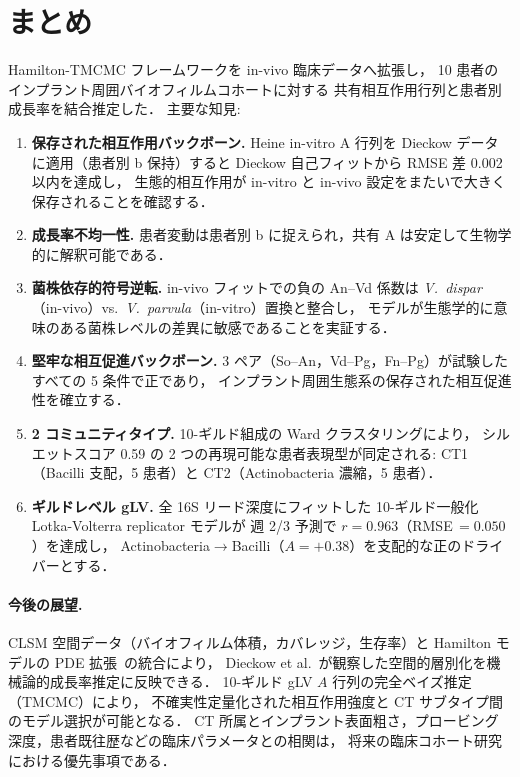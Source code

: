 \documentclass[11pt,a4paper]{article}
\begin{document}
\section{まとめ}
\label{sec:conclusions}

Hamilton-TMCMC フレームワークを in-vivo 臨床データへ拡張し，
10 患者のインプラント周囲バイオフィルムコホートに対する
共有相互作用行列と患者別成長率を結合推定した．
主要な知見:
\begin{enumerate}[nosep,leftmargin=*]
\item \textbf{保存された相互作用バックボーン.}
  Heine in-vitro A 行列を Dieckow データに適用（患者別 b 保持）すると
  Dieckow 自己フィットから RMSE 差 0.002 以内を達成し，
  生態的相互作用が in-vitro と in-vivo 設定をまたいで大きく保存されることを確認する．
\item \textbf{成長率不均一性.}
  患者変動は患者別 b に捉えられ，共有 A は安定して生物学的に解釈可能である．
\item \textbf{菌株依存的符号逆転.}
  in-vivo フィットでの負の An--Vd 係数は
  \textit{V.~dispar}（in-vivo）vs.\ \textit{V.~parvula}（in-vitro）置換と整合し，
  モデルが生態学的に意味のある菌株レベルの差異に敏感であることを実証する．
\item \textbf{堅牢な相互促進バックボーン.}
  3 ペア（So--An，Vd--Pg，Fn--Pg）が試験したすべての 5 条件で正であり，
  インプラント周囲生態系の保存された相互促進性を確立する．
\item \textbf{2 コミュニティタイプ.}
  10-ギルド組成の Ward クラスタリングにより，
  シルエットスコア 0.59 の 2 つの再現可能な患者表現型が同定される:
  CT1（Bacilli 支配，5 患者）と CT2（Actinobacteria 濃縮，5 患者）．
\item \textbf{ギルドレベル gLV.}
  全 16S リード深度にフィットした 10-ギルド一般化 Lotka-Volterra replicator モデルが
  週 2/3 予測で $r=0.963$（RMSE\,$=0.050$）を達成し，
  Actinobacteria$\to$Bacilli（$A=+0.38$）を支配的な正のドライバーとする．
\end{enumerate}

\paragraph{今後の展望.}
CLSM 空間データ（バイオフィルム体積，カバレッジ，生存率）と
Hamilton モデルの PDE 拡張~\cite{Klempt2025ContinuumBiofilm}の統合により，
Dieckow et al.\ が観察した空間的層別化を機械論的成長率推定に反映できる．
10-ギルド gLV $A$ 行列の完全ベイズ推定（TMCMC）により，
不確実性定量化された相互作用強度と CT サブタイプ間のモデル選択が可能となる．
CT 所属とインプラント表面粗さ，プロービング深度，患者既往歴などの臨床パラメータとの相関は，
将来の臨床コホート研究における優先事項である．



\end{document}
